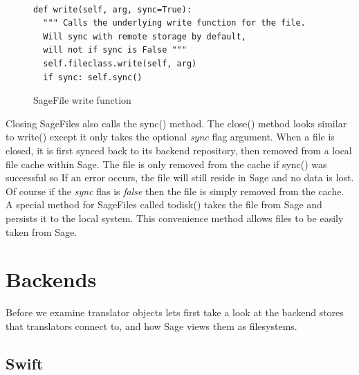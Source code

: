 \begin{figure}[h]
\centering
\begin{lstlisting}

def write(self, arg, sync=True):
  """ Calls the underlying write function for the file.
  Will sync with remote storage by default, 
  will not if sync is False """
  self.fileclass.write(self, arg)
  if sync: self.sync()

\end{lstlisting}
\caption{SageFile write function}
\label{fig:sagefilewrite}
\end{figure}

Closing SageFiles also calls the sync() method. The close() method looks similar to write() except it only takes the optional \textit{sync} flag argument. When a file is closed, it is first synced back to its backend  repository, then removed from a local file cache within Sage. The file is only removed from the cache if sync() was successful so If an error occurs, the file will still reside in Sage and no data is lost. Of course if the \textit{sync} flas is \textit{false} then the file is simply removed from the cache. A special method for SageFiles called todisk() takes the file from Sage and persists it to the local system. This convenience method allows files to be easily taken from Sage.



\section{Backends}
\label{sec:backends}

Before we examine translator objects lets first take a look at the backend stores that translators connect to, and how Sage views them as filesystems. 

\subsection{Swift}

